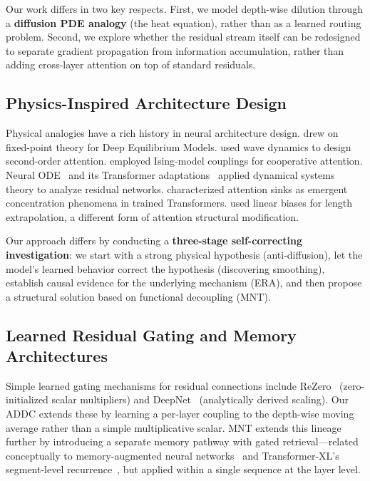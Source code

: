 \documentclass[10pt]{article}
\begin{document}
Our work differs in two key respects. First, we model depth-wise dilution through a \textbf{diffusion PDE analogy} (the heat equation), rather than as a learned routing problem. Second, we explore whether the residual stream itself can be redesigned to separate gradient propagation from information accumulation, rather than adding cross-layer attention on top of standard residuals.

\subsection{Physics-Inspired Architecture Design}

Physical analogies have a rich history in neural architecture design. \cite{bai2019deq} drew on fixed-point theory for Deep Equilibrium Models. \cite{wavy2025neurips} used wave dynamics to design second-order attention. \cite{boltzmann2026} employed Ising-model couplings for cooperative attention. Neural ODE~\cite{chen2018neuralode} and its Transformer adaptations~\cite{neuralode2025iclr} applied dynamical systems theory to analyze residual networks. \cite{xiao2023streaming} characterized attention sinks as emergent concentration phenomena in trained Transformers. \cite{press2022alibi} used linear biases for length extrapolation, a different form of attention structural modification.

Our approach differs by conducting a \textbf{three-stage self-correcting investigation}: we start with a strong physical hypothesis (anti-diffusion), let the model's learned behavior correct the hypothesis (discovering smoothing), establish causal evidence for the underlying mechanism (ERA), and then propose a structural solution based on functional decoupling (MNT).

\subsection{Learned Residual Gating and Memory Architectures}

Simple learned gating mechanisms for residual connections include ReZero~\cite{bachlechner2020rezero} (zero-initialized scalar multipliers) and DeepNet~\cite{deepnet2022} (analytically derived scaling). Our ADDC extends these by learning a per-layer coupling to the depth-wise moving average rather than a simple multiplicative scalar. MNT extends this lineage further by introducing a separate memory pathway with gated retrieval---related conceptually to memory-augmented neural networks~\cite{graves2014ntm} and Transformer-XL's segment-level recurrence~\cite{dai2019transformerxl}, but applied within a single sequence at the layer level.
\end{document}
